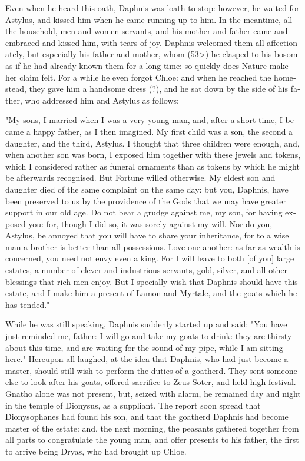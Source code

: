 \documentclass{book}
\begin{document}
\begin{pairs}
\begin{Rightside}
\begin{english}
  Even when he heard this oath, Daphnis was loath to stop: however, he waited for Astylus, and kissed him when he came running up to him.  In the meantime, all the household, men and women servants, and his mother and father came and embraced and kissed him, with tears of joy.  Daphnis welcomed them all affectionately, but especially his father and mother, whom (53>) he clasped to his bosom as if he had already known them for a long time: so quickly does Nature make her claim felt.  For a while he even forgot Chloe: and when he reached the homestead, they gave him a handsome dress (?), and he sat down by the side of his father, who addressed him and Astylus as follows:
\pend


  "My sons, I married when I was a very young man, and, after a short time, I became a happy father, as I then imagined.  My first child was a son, the second a daughter, and the third, Astylus.  I thought that three children were enough, and, when another son was born, I exposed him together with these jewels and tokens, which I considered rather as funeral ornaments than as tokens by which he might be afterwards recognised.  But Fortune willed otherwise.  My eldest son and daughter died of the same complaint on the same day: but you, Daphnis, have been preserved to us by the providence of the Gods that we may have greater support in our old age.  Do not bear a grudge against me, my son, for having exposed you: for, though I did so, it was sorely against my will.  Nor do you, Astylus, be annoyed that you will have to share your inheritance, for to a wise man a brother is better than all possessions.  Love one another: as far as wealth is concerned, you need not envy even a king.  For I will leave to both [of you] large estates, a number of clever and industrious servants, gold, silver, and all other blessings that rich men enjoy.  But I specially wish that Daphnis should have this estate, and I make him a present of Lamon and Myrtale, and the goats which he has tended."
\pend


  While he was still speaking, Daphnis suddenly started up and said: "You have just reminded me, father: I will go and take my goats to drink: they are thirsty about this time, and are waiting for the sound of my pipe, while I am sitting here."  Hereupon all laughed, at the idea that Daphnis, who had just become a master, should still wish to perform the duties of a goatherd.  They sent someone else to look after his goats, offered sacrifice to Zeus Soter, and held high festival.  Gnatho alone was not present, but, seized with alarm, he remained day and night in the temple of Dionysus, as a suppliant.  The report soon spread that Dionysophanes had found his son, and that the goatherd Daphnis had become master of the estate: and, the next morning, the peasants gathered together from all parts to congratulate the young man, and offer presents to his father, the first to arrive being Dryas, who had brought up Chloe.
\pend



\end{english}
\end{Rightside}
\end{pairs}
\end{document}
